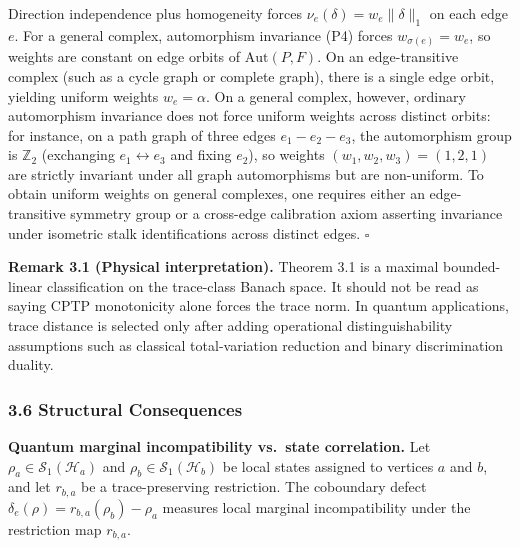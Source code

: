 \documentclass[
]{article}
\begin{document}
Direction independence plus homogeneity forces \(\nu_e(\delta) = w_e \|\delta\|_1\) on each edge \(e\). For a general complex, automorphism invariance (P4) forces \(w_{\sigma(e)} = w_e\), so weights are constant on edge orbits of \(\mathrm{Aut}(P, F)\). On an edge-transitive complex (such as a cycle graph or complete graph), there is a single edge orbit, yielding uniform weights \(w_e = \alpha\). On a general complex, however, ordinary automorphism invariance does not force uniform weights across distinct orbits: for instance, on a path graph of three edges \(e_1 - e_2 - e_3\), the automorphism group is \(\mathbb{Z}_2\) (exchanging \(e_1 \leftrightarrow e_3\) and fixing \(e_2\)), so weights \((w_1, w_2, w_3) = (1, 2, 1)\) are strictly invariant under all graph automorphisms but are non-uniform. To obtain uniform weights on general complexes, one requires either an edge-transitive symmetry group or a cross-edge calibration axiom asserting invariance under isometric stalk identifications across distinct edges. \(\square\)

\textbf{Remark 3.1 (Physical interpretation).} Theorem 3.1 is a maximal bounded-linear classification on the trace-class Banach space. It should not be read as saying CPTP monotonicity alone forces the trace norm. In quantum applications, trace distance is selected only after adding operational distinguishability assumptions such as classical total-variation reduction and binary discrimination duality.

\subsubsection{3.6 Structural Consequences}\label{structural-consequences}

\textbf{Quantum marginal incompatibility vs.~state correlation.} Let \(\rho_a \in \mathcal{S}_1(\mathcal{H}_a)\) and \(\rho_b \in \mathcal{S}_1(\mathcal{H}_b)\) be local states assigned to vertices \(a\) and \(b\), and let \(r_{b,a}\) be a trace-preserving restriction. The coboundary defect \(\delta_e(\rho) = r_{b,a}(\rho_b) - \rho_a\) measures local marginal incompatibility under the restriction map \(r_{b,a}\).
\end{document}
